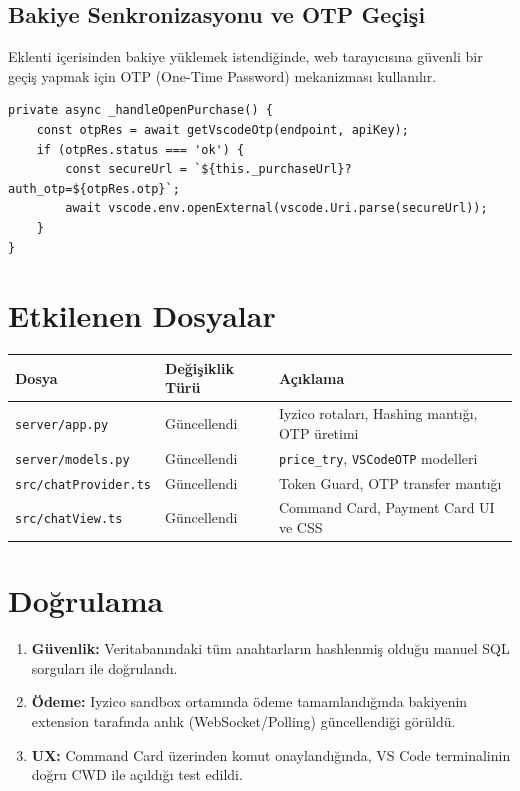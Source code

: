 \documentclass[12pt,a4paper]{article}
\begin{document}
\subsection{Bakiye Senkronizasyonu ve OTP Geçişi}

Eklenti içerisinden bakiye yüklemek istendiğinde, web tarayıcısına güvenli bir geçiş yapmak için OTP (One-Time Password) mekanizması kullanılır.

\begin{lstlisting}[caption={OTP ile Güvenli Yönlendirme (chatProvider.ts)}]
private async _handleOpenPurchase() {
    const otpRes = await getVscodeOtp(endpoint, apiKey);
    if (otpRes.status === 'ok') {
        const secureUrl = `${this._purchaseUrl}?auth_otp=${otpRes.otp}`;
        await vscode.env.openExternal(vscode.Uri.parse(secureUrl));
    }
}
\end{lstlisting}

\section{Etkilenen Dosyalar}

\begin{center}
\begin{tabular}{@{}lll@{}}
\toprule
\textbf{Dosya} & \textbf{Değişiklik Türü} & \textbf{Açıklama} \\
\midrule
\texttt{server/app.py}        & Güncellendi & Iyzico rotaları, Hashing mantığı, OTP üretimi \\
\texttt{server/models.py}     & Güncellendi & \texttt{price\_try}, \texttt{VSCodeOTP} modelleri \\
\texttt{src/chatProvider.ts}  & Güncellendi & Token Guard, OTP transfer mantığı \\
\texttt{src/chatView.ts}      & Güncellendi & Command Card, Payment Card UI ve CSS \\
\bottomrule
\end{tabular}
\end{center}

\section{Doğrulama}

\begin{enumerate}
    \item \textbf{Güvenlik:} Veritabanındaki tüm anahtarların hashlenmiş olduğu manuel SQL sorguları ile doğrulandı.
    \item \textbf{Ödeme:} Iyzico sandbox ortamında ödeme tamamlandığında bakiyenin extension tarafında anlık (WebSocket/Polling) güncellendiği görüldü.
    \item \textbf{UX:} Command Card üzerinden komut onaylandığında, VS Code terminalinin doğru CWD ile açıldığı test edildi.
\end{enumerate}
\end{document}
